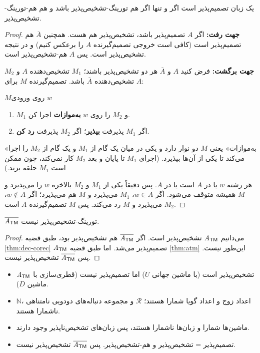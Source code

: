 \begin{theorem}\label{thm:dec-corec}
یک زبان تصمیم‌پذیر است اگر و تنها اگر هم تورینگ-تشخیص‌پذیر باشد و هم هم-تورینگ-تشخیص‌پذیر.
\end{theorem}
\begin{proof}
\textbf{جهت رفت:} اگر $A$ تصمیم‌پذیر باشد، تشخیص‌پذیر هم هست. همچنین $\overline{A}$ هم تصمیم‌پذیر است (کافی است خروجی تصمیم‌گیرنده $A$ را برعکس کنیم) و در نتیجه تشخیص‌پذیر است. پس $A$ هم-تشخیص‌پذیر است.

\textbf{جهت برگشت:} فرض کنید $A$ و $\overline{A}$ هر دو تشخیص‌پذیر باشند؛ $M_1$ تشخیص‌دهنده $A$ و $M_2$ تشخیص‌دهنده $\overline{A}$ باشد. تصمیم‌گیرنده $M$ برای $A$:
\begin{algo}{$M$}{روی ورودی $w$}
\begin{enumerate}
\item $M_1$ و $M_2$ را روی $w$ \textbf{به‌موازات} اجرا کن.
\item اگر $M_1$ پذیرفت \textbf{بپذیر}؛ اگر $M_2$ پذیرفت \textbf{رد کن}.
\end{enumerate}
\end{algo}
«به‌موازات» یعنی $M$ دو نوار دارد و یکی در میان یک گام از $M_1$ و یک گام از $M_2$ را اجرا می‌کند تا یکی از آن‌ها بپذیرد. (اجرای $M_1$ تا پایان و بعد $M_2$ کار نمی‌کند، چون ممکن است $M_1$ حلقه بزند.)

هر رشته $w$ یا در $A$ است یا در $\overline{A}$. پس دقیقاً یکی از $M_1$ و $M_2$ بالاخره $w$ را می‌پذیرد و $M$ همیشه متوقف می‌شود. اگر $w\in A$، $M_1$ می‌پذیرد و $M$ هم می‌پذیرد؛ اگر $w\notin A$، $M_2$ می‌پذیرد و $M$ رد می‌کند. پس $M$ تصمیم‌گیرنده $A$ است.
\end{proof}

\begin{corollary}
$\overline{\mathit{A}_{\mathsf{TM}}}$ تورینگ-تشخیص‌پذیر نیست.
\end{corollary}
\begin{proof}
می‌دانیم $\mathit{A}_{\mathsf{TM}}$ تشخیص‌پذیر است. اگر $\overline{\mathit{A}_{\mathsf{TM}}}$ هم تشخیص‌پذیر بود، طبق قضیه \ref{thm:dec-corec} $\mathit{A}_{\mathsf{TM}}$ تصمیم‌پذیر می‌شد. اما طبق قضیه \ref{thm:atm} این‌طور نیست. پس $\overline{\mathit{A}_{\mathsf{TM}}}$ تشخیص‌پذیر نیست.
\end{proof}

\begin{summary}
\begin{itemize}
\item $\mathit{A}_{\mathsf{TM}}$ تشخیص‌پذیر است (با ماشین جهانی $U$) اما تصمیم‌پذیر نیست (قطری‌سازی با ماشین $D$).
\item $\mathbb{N}$، اعداد زوج و اعداد گویا شمارا هستند؛ $\mathcal{R}$ و مجموعه دنباله‌های دودویی نامتناهی ناشمارا هستند.
\item ماشین‌ها شمارا و زبان‌ها ناشمارا هستند، پس زبان‌های تشخیص‌ناپذیر وجود دارند.
\item تصمیم‌پذیر = تشخیص‌پذیر و هم-تشخیص‌پذیر. پس $\overline{\mathit{A}_{\mathsf{TM}}}$ تشخیص‌پذیر نیست.
\end{itemize}
\end{summary}
